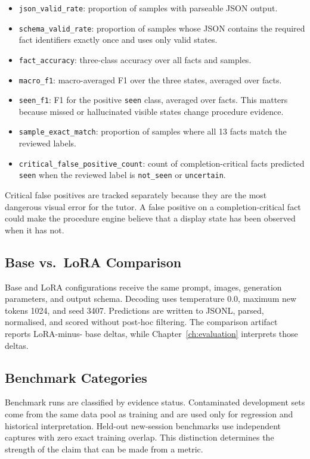 \begin{itemize}
\item \texttt{json\_valid\_rate}: proportion of samples with parseable JSON
output.
\item \texttt{schema\_valid\_rate}: proportion of samples whose JSON contains
the required fact identifiers exactly once and uses only valid states.
\item \texttt{fact\_accuracy}: three-class accuracy over all facts and samples.
\item \texttt{macro\_f1}: macro-averaged F1 over the three states, averaged
over facts.
\item \texttt{seen\_f1}: F1 for the positive \texttt{seen} class, averaged over
facts. This matters because missed or hallucinated visible states change
procedure evidence.
\item \texttt{sample\_exact\_match}: proportion of samples where all 13 facts
match the reviewed labels.
\item \texttt{critical\_false\_positive\_count}: count of completion-critical
facts predicted \texttt{seen} when the reviewed label is \texttt{not\_seen} or
\texttt{uncertain}.
\end{itemize}

Critical false positives are tracked separately because they are the most
dangerous visual error for the tutor. A false positive on a completion-critical
fact could make the procedure engine believe that a display state has been
observed when it has not.

\subsection{Base vs.\ LoRA Comparison}

Base and LoRA configurations receive the same prompt, images, generation
parameters, and output schema. Decoding uses temperature 0.0, maximum new tokens
1024, and seed 3407. Predictions are written to JSONL, parsed, normalised, and
scored without post-hoc filtering. The comparison artifact reports LoRA-minus-
base deltas, while Chapter~\ref{ch:evaluation} interprets those deltas.

\subsection{Benchmark Categories}

Benchmark runs are classified by evidence status. Contaminated development sets
come from the same data pool as training and are used only for regression and
historical interpretation. Held-out new-session benchmarks use independent
captures with zero exact training overlap. This distinction determines the
strength of the claim that can be made from a metric.

